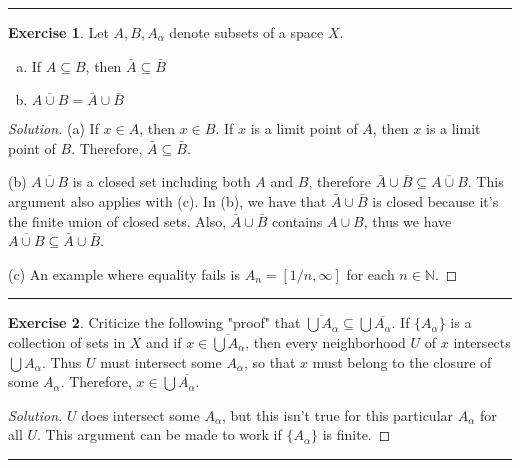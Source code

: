 \documentclass{article}
\theoremstyle{definition}
\newtheorem{exercise}{Exercise}[section]
\begin{document}
\hrule

\begin{exercise}
  Let $A,B,A_\alpha$ denote subsets of a space $X$.
  \begin{enumerate}[(a)]
    \item If $A\subseteq B$, then $\bar{A}\subseteq\bar{B}$
    \item $\overline{A\cup B} = \bar{A}\cup\bar{B}$
  \end{enumerate}
\end{exercise}
\begin{proof}[Solution]
  (a) If $x\in A$, then $x\in B$. If $x$ is a limit point of $A$, then $x$ is a limit point of $B$. Therefore, $\bar{A}\subseteq\bar{B}$.

  (b) $\overline{A\cup B}$ is a closed set including both $A$ and $B$, therefore $\bar{A}\cup\bar{B}\subseteq\overline{A\cup B}$. This argument also applies with (c). In (b), we have that $\bar{A}\cup\bar{B}$ is closed because it's the finite union of closed sets. Also, $\bar{A}\cup\bar{B}$ contains $A\cup B$, thus we have $\overline{A\cup B}\subseteq\bar{A}\cup\bar{B}$.

  (c) An example where equality fails is $A_n = [1/n,\infty]$ for each $n\in\mathbb{N}$.
\end{proof}

\hrule

\begin{exercise}
  Criticize the following "proof" that $\overline{\bigcup A_\alpha}\subseteq \bigcup\overline{A_\alpha}$. If $\{A_\alpha\}$ is a collection of sets in $X$ and if $x\in\overline{\bigcup A_\alpha}$, then every neighborhood $U$ of $x$ intersects $\bigcup A_\alpha$. Thus $U$ must intersect some $A_\alpha$, so that $x$ must belong to the closure of some $A_\alpha$. Therefore, $x\in\bigcup\overline{A_\alpha}$.
\end{exercise}
\begin{proof}[Solution]
  $U$ does intersect some $A_\alpha$, but this isn't true for this particular $A_\alpha$ for all $U$. This argument can be made to work if $\{A_\alpha\}$ is finite.
\end{proof}

\hrule
\end{document}
